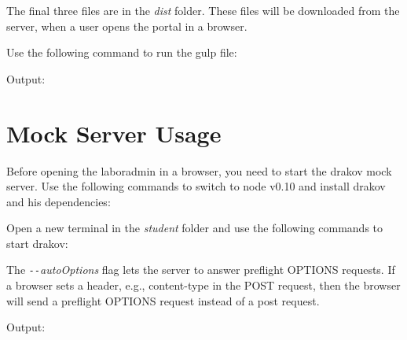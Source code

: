 The final three files are in the \emph{dist} folder. These files will be downloaded from the server, when a user opens the portal in a browser.

Use the following command to run the gulp file:


Output:


\section{Mock Server Usage}
\label{mock-server-usage}
Before opening the laboradmin in a browser, you need to start the drakov mock server. Use the following commands to switch to node v0.10 and install drakov and his dependencies:



Open a new terminal in the \emph{student} folder and use the following commands to start drakov:

	
The \emph{\texttt{-{}-}autoOptions} flag lets the server to answer preflight OPTIONS requests. If a browser sets a header, e.g., content-type in the POST request, then the browser will send a preflight OPTIONS request instead of a post request.
	
Output:

